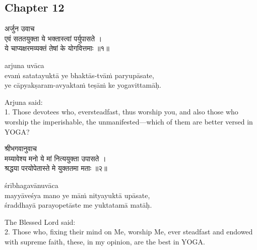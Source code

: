 \chapterdrop

\begin{center}

\headerspace
{}

\section{Chapter 12}

\headerspace
{}

\headerspace
{}

\headerspace
{}

\headerspace
\end{center}

\begin{gitaverse}
अर्जुन उवाच \\
एवं सततयुक्ता ये भक्तास्त्वां पर्युपासते । \\
ये चाप्यक्षरमव्यक्तं तेषां के योगवित्तमाः ॥१॥
\end{gitaverse}

\begin{transliteration}
arjuna uvāca \\
evaṁ satatayuktā ye bhaktās-tvāṁ paryupāsate, \\
ye cāpyakṣaram-avyaktaṁ teṣāṁ ke yogavittamāḥ.
\end{transliteration}

Arjuna said: \\
1. Those devotees who, eversteadfast, thus worship you, and also those who
worship the imperishable, the unmanifested---which of them are better versed in
YOGA?\@

\begin{gitaverse}
श्रीभगवानुवाच \\
मय्यावेश्य मनो ये मां नित्ययुक्ता उपासते । \\
श्रद्धया परयोपेतास्ते मे युक्ततमा मताः ॥२॥
\end{gitaverse}

\begin{transliteration}
śrībhagavānuvāca \\
mayyāveśya mano ye māṁ nityayuktā upāsate, \\
śraddhayā parayopetāste me yuktatamā matāḥ.
\end{transliteration}

The Blessed Lord said: \\
2. Those who, fixing their mind on Me, worship Me, ever steadfast and endowed
with supreme faith, these, in my opinion, are the best in YOGA.\@

